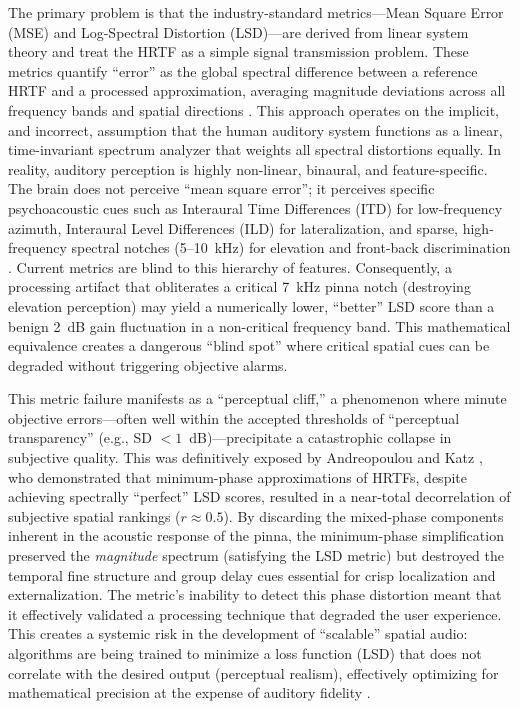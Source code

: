 \documentclass[12pt,a4paper]{article}
\begin{document}
The primary problem is that the industry-standard metrics---Mean Square Error (MSE) and Log-Spectral Distortion (LSD)---are derived from linear system theory and treat the HRTF as a simple signal transmission problem. These metrics quantify ``error'' as the global spectral difference between a reference HRTF and a processed approximation, averaging magnitude deviations across all frequency bands and spatial directions \cite{andreopoulou2022}. This approach operates on the implicit, and incorrect, assumption that the human auditory system functions as a linear, time-invariant spectrum analyzer that weights all spectral distortions equally. In reality, auditory perception is highly non-linear, binaural, and feature-specific. The brain does not perceive ``mean square error''; it perceives specific psychoacoustic cues such as Interaural Time Differences (ITD) for low-frequency azimuth, Interaural Level Differences (ILD) for lateralization, and sparse, high-frequency spectral notches (5--10~kHz) for elevation and front-back discrimination \cite{asaudio2025}. Current metrics are blind to this hierarchy of features. Consequently, a processing artifact that obliterates a critical 7~kHz pinna notch (destroying elevation perception) may yield a numerically lower, ``better'' LSD score than a benign 2~dB gain fluctuation in a non-critical frequency band. This mathematical equivalence creates a dangerous ``blind spot'' where critical spatial cues can be degraded without triggering objective alarms.

This metric failure manifests as a ``perceptual cliff,'' a phenomenon where minute objective errors---often well within the accepted thresholds of ``perceptual transparency'' (e.g., SD $< 1$~dB)---precipitate a catastrophic collapse in subjective quality. This was definitively exposed by Andreopoulou and Katz \cite{andreopoulou2022}, who demonstrated that minimum-phase approximations of HRTFs, despite achieving spectrally ``perfect'' LSD scores, resulted in a near-total decorrelation of subjective spatial rankings ($r \approx 0.5$). By discarding the mixed-phase components inherent in the acoustic response of the pinna, the minimum-phase simplification preserved the \textit{magnitude} spectrum (satisfying the LSD metric) but destroyed the temporal fine structure and group delay cues essential for crisp localization and externalization. The metric's inability to detect this phase distortion meant that it effectively validated a processing technique that degraded the user experience. This creates a systemic risk in the development of ``scalable'' spatial audio: algorithms are being trained to minimize a loss function (LSD) that does not correlate with the desired output (perceptual realism), effectively optimizing for mathematical precision at the expense of auditory fidelity \cite{itd_loss2024}.
\end{document}
